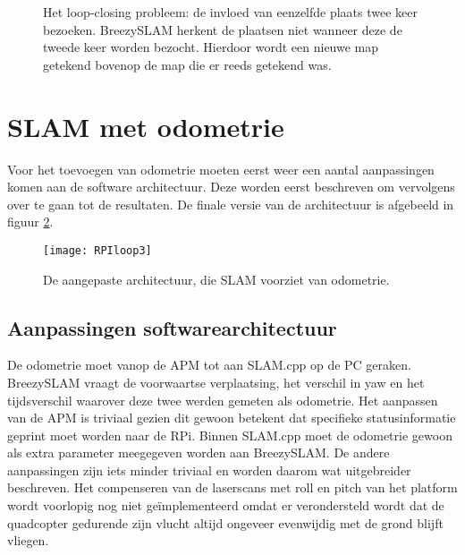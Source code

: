 \begin{figure}[h]
	\centering
	\hspace{0.01\linewidth}
	\caption{Het loop-closing probleem: de invloed van eenzelfde plaats twee keer bezoeken. BreezySLAM herkent de plaatsen niet wanneer deze de tweede keer worden bezocht. Hierdoor wordt een nieuwe map getekend bovenop de map die er reeds getekend was.} \label{fig:loopclosing}
\end{figure}

\section{SLAM met odometrie}
Voor het toevoegen van odometrie moeten eerst weer een aantal aanpassingen komen aan de software architectuur. Deze worden eerst beschreven om vervolgens over te gaan tot de resultaten. De finale versie van de architectuur is afgebeeld in figuur \ref{fig:RPIloop3}.

\begin{figure}[h]
	\centering
	\texttt{[image: RPIloop3]}
	\caption{De aangepaste architectuur, die SLAM voorziet van odometrie.} \label{fig:RPIloop3}
\end{figure}

\subsection{Aanpassingen softwarearchitectuur}
De odometrie moet vanop de APM tot aan SLAM.cpp op de PC geraken. BreezySLAM vraagt de voorwaartse verplaatsing, het verschil in yaw en het tijdsverschil waarover deze twee werden gemeten als odometrie. Het aanpassen van de APM is triviaal gezien dit gewoon betekent dat specifieke statusinformatie geprint moet worden naar de RPi. Binnen SLAM.cpp moet de odometrie gewoon als extra parameter meegegeven worden aan BreezySLAM. De andere aanpassingen zijn iets minder triviaal en worden daarom wat uitgebreider beschreven. Het compenseren van de laserscans met roll en pitch van het platform wordt voorlopig nog niet ge\"implementeerd omdat er verondersteld wordt dat de quadcopter gedurende zijn vlucht altijd ongeveer evenwijdig met de grond blijft vliegen.

